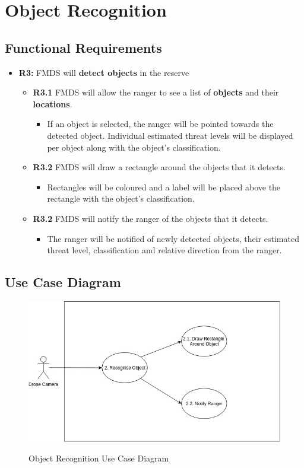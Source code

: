 \section{ Object Recognition }
\subsection{Functional Requirements}
	\begin{flushleft}
		\begin{itemize}
			\item{\textbf{R3:}} FMDS will \textbf{detect objects} in the reserve
				\begin{itemize}
					\item{\textbf{R3.1}} FMDS will allow the ranger to see a list of \textbf{objects} and their \textbf{locations}.
						\begin{itemize}
							\item If an object is selected, the ranger will be pointed towards the detected object. Individual estimated threat levels will be displayed per object along with the object's classification.
						\end{itemize} 
					\item{\textbf{R3.2}} FMDS will draw a rectangle around the objects that it detects.
						\begin{itemize}
							\item Rectangles will be coloured and a label will be placed above the rectangle with the object's classification.
						\end{itemize} 
					\item{\textbf{R3.2}} FMDS will notify the ranger of the objects that it detects.
						\begin{itemize}
							\item The ranger will be notified of newly detected objects, their estimated threat level, classification and relative direction from the ranger.
						\end{itemize} 
				\end{itemize}
		\end{itemize}
	\end{flushleft}

\subsection{Use Case Diagram}
\begin{flushleft}
	\begin{figure}[h!]
		\centering
		\includegraphics[scale=0.5]{./assets/images/object-recognition-ucd.jpg}
		\label{fig: object-recognition-ucd }
		\caption{Object Recognition Use Case Diagram}
	\end{figure}

\end{flushleft}

